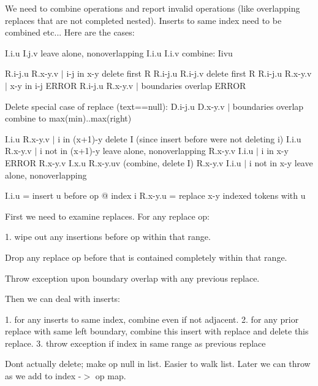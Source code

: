 We need to combine operations and report invalid operations (like overlapping replaces that are not completed nested). Inserts to same index need to be combined etc... Here are the cases\+: 

I.\+i.\+u I.\+j.\+v leave alone, nonoverlapping I.\+i.\+u I.\+i.\+v combine\+: Iivu

R.\+i-\/j.\+u R.\+x-\/y.\+v $\vert$ i-\/j in x-\/y delete first R R.\+i-\/j.\+u R.\+i-\/j.\+v delete first R R.\+i-\/j.\+u R.\+x-\/y.\+v $\vert$ x-\/y in i-\/j E\+R\+R\+OR R.\+i-\/j.\+u R.\+x-\/y.\+v $\vert$ boundaries overlap E\+R\+R\+OR

Delete special case of replace (text==null)\+: D.\+i-\/j.\+u D.\+x-\/y.\+v $\vert$ boundaries overlap combine to max(min)..max(right)

I.\+i.\+u R.\+x-\/y.\+v $\vert$ i in (x+1)-\/y delete I (since insert before we\textquotesingle{}re not deleting i) I.\+i.\+u R.\+x-\/y.\+v $\vert$ i not in (x+1)-\/y leave alone, nonoverlapping R.\+x-\/y.\+v I.\+i.\+u $\vert$ i in x-\/y E\+R\+R\+OR R.\+x-\/y.\+v I.\+x.\+u R.\+x-\/y.\+uv (combine, delete I) R.\+x-\/y.\+v I.\+i.\+u $\vert$ i not in x-\/y leave alone, nonoverlapping

I.\+i.\+u = insert u before op @ index i R.\+x-\/y.\+u = replace x-\/y indexed tokens with u

First we need to examine replaces. For any replace op\+: \begin{DoxyVerb}   1. wipe out any insertions before op within that range.
\end{DoxyVerb}

\begin{DoxyEnumerate}
\item Drop any replace op before that is contained completely within that range.
\item Throw exception upon boundary overlap with any previous replace.
\end{DoxyEnumerate}

Then we can deal with inserts\+: \begin{DoxyVerb}   1. for any inserts to same index, combine even if not adjacent.
   2. for any prior replace with same left boundary, combine this
   insert with replace and delete this replace.
   3. throw exception if index in same range as previous replace
\end{DoxyVerb}


Don\textquotesingle{}t actually delete; make op null in list. Easier to walk list. Later we can throw as we add to index -\/$>$ op map.

